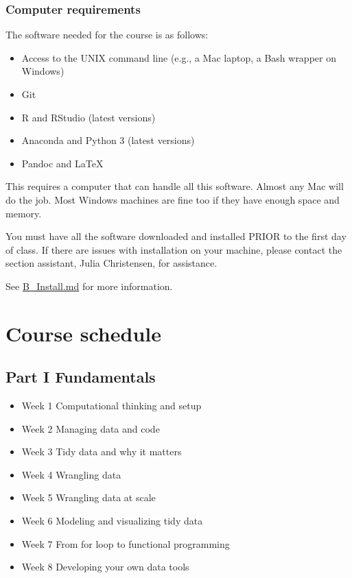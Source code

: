 \documentclass[
]{book}
\providecommand{\tightlist}{%
  \setlength{\itemsep}{0pt}\setlength{\parskip}{0pt}}
\begin{document}
\hypertarget{computer-requirements}{%
\subsubsection{Computer requirements}\label{computer-requirements}}

The software needed for the course is as follows:

\begin{itemize}
\tightlist
\item
  Access to the UNIX command line (e.g., a Mac laptop, a Bash wrapper on Windows)
\item
  Git
\item
  R and RStudio (latest versions)
\item
  Anaconda and Python 3 (latest versions)
\item
  Pandoc and LaTeX
\end{itemize}

This requires a computer that can handle all this software. Almost any Mac will do the job. Most Windows machines are fine too if they have enough space and memory.

You must have all the software downloaded and installed PRIOR to the first day of class. If there are issues with installation on your machine, please contact the section assistant, Julia Christensen, for assistance.

See \href{https://github.com/jaeyk/PS239T/blob/master/B_Install.md}{B\_Install.md} for more information.

\hypertarget{course-schedule}{%
\section{Course schedule}\label{course-schedule}}

\hypertarget{part-i-fundamentals-1}{%
\subsection{Part I Fundamentals}\label{part-i-fundamentals-1}}

\begin{itemize}
\tightlist
\item
  Week 1 Computational thinking and setup
\item
  Week 2 Managing data and code
\item
  Week 3 Tidy data and why it matters
\item
  Week 4 Wrangling data
\item
  Week 5 Wrangling data at scale
\item
  Week 6 Modeling and visualizing tidy data
\item
  Week 7 From for loop to functional programming
\item
  Week 8 Developing your own data tools
\end{itemize}
\end{document}
